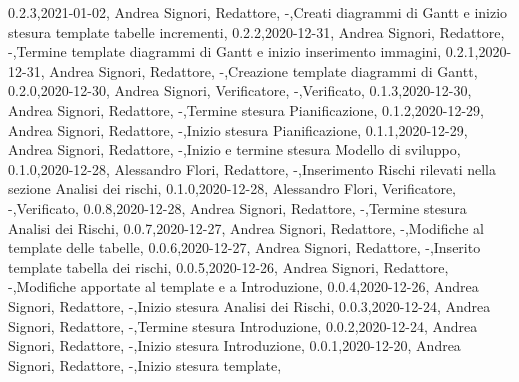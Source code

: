 {    {0.2.3,2021-01-02, Andrea Signori, Redattore, -,Creati diagrammi di Gantt e inizio stesura template tabelle incrementi},
    {0.2.2,2020-12-31, Andrea Signori, Redattore, -,Termine template diagrammi di Gantt e inizio inserimento immagini},
    {0.2.1,2020-12-31, Andrea Signori, Redattore, -,Creazione template diagrammi di Gantt},
    {0.2.0,2020-12-30, Andrea Signori, Verificatore, -,Verificato},
    {0.1.3,2020-12-30, Andrea Signori, Redattore, -,Termine stesura Pianificazione},
    {0.1.2,2020-12-29, Andrea Signori, Redattore, -,Inizio stesura Pianificazione},
    {0.1.1,2020-12-29, Andrea Signori, Redattore, -,Inizio e termine stesura Modello di sviluppo},
    {0.1.0,2020-12-28, Alessandro Flori, Redattore, -,Inserimento Rischi rilevati nella sezione Analisi dei rischi},
    {0.1.0,2020-12-28, Alessandro Flori, Verificatore, -,Verificato},
    {0.0.8,2020-12-28, Andrea Signori, Redattore, -,Termine stesura Analisi dei Rischi},
    {0.0.7,2020-12-27, Andrea Signori, Redattore, -,Modifiche al template delle tabelle},
    {0.0.6,2020-12-27, Andrea Signori, Redattore, -,Inserito template tabella dei rischi},
    {0.0.5,2020-12-26, Andrea Signori, Redattore, -,Modifiche apportate al template e a Introduzione},
    {0.0.4,2020-12-26, Andrea Signori, Redattore, -,Inizio stesura Analisi dei Rischi},
    {0.0.3,2020-12-24, Andrea Signori, Redattore, -,Termine stesura Introduzione},
    {0.0.2,2020-12-24, Andrea Signori, Redattore, -,Inizio stesura Introduzione},
    {0.0.1,2020-12-20, Andrea Signori, Redattore, -,Inizio stesura template},
}
